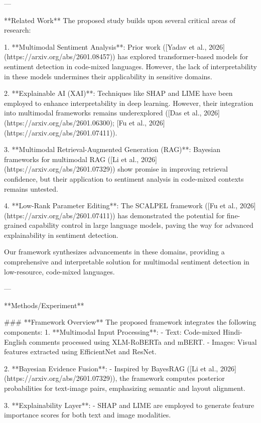 ---

**Related Work**  
The proposed study builds upon several critical areas of research:

1. **Multimodal Sentiment Analysis**: Prior work ([Yadav et al., 2026](https://arxiv.org/abs/2601.08457)) has explored transformer-based models for sentiment detection in code-mixed languages. However, the lack of interpretability in these models undermines their applicability in sensitive domains.
   
2. **Explainable AI (XAI)**: Techniques like SHAP and LIME have been employed to enhance interpretability in deep learning. However, their integration into multimodal frameworks remains underexplored ([Das et al., 2026](https://arxiv.org/abs/2601.06300); [Fu et al., 2026](https://arxiv.org/abs/2601.07411)).
   
3. **Multimodal Retrieval-Augmented Generation (RAG)**: Bayesian frameworks for multimodal RAG ([Li et al., 2026](https://arxiv.org/abs/2601.07329)) show promise in improving retrieval confidence, but their application to sentiment analysis in code-mixed contexts remains untested.

4. **Low-Rank Parameter Editing**: The SCALPEL framework ([Fu et al., 2026](https://arxiv.org/abs/2601.07411)) has demonstrated the potential for fine-grained capability control in large language models, paving the way for advanced explainability in sentiment detection.

Our framework synthesizes advancements in these domains, providing a comprehensive and interpretable solution for multimodal sentiment detection in low-resource, code-mixed languages.

---

**Methods/Experiment**  

### **Framework Overview**  
The proposed framework integrates the following components:
1. **Multimodal Input Processing**:
   - Text: Code-mixed Hindi-English comments processed using XLM-RoBERTa and mBERT.
   - Images: Visual features extracted using EfficientNet and ResNet.
   
2. **Bayesian Evidence Fusion**:
   - Inspired by BayesRAG ([Li et al., 2026](https://arxiv.org/abs/2601.07329)), the framework computes posterior probabilities for text-image pairs, emphasizing semantic and layout alignment.

3. **Explainability Layer**:
   - SHAP and LIME are employed to generate feature importance scores for both text and image modalities.

